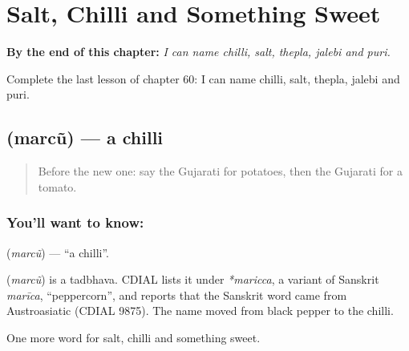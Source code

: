 
\chapter{Salt, Chilli and Something Sweet}
\label{ch:gu-salt-chilli-and-something-sweet}

\begin{chapteropening}
\textbf{By the end of this chapter:} \emph{I can name chilli, salt, thepla, jalebi and puri.}

Complete the last lesson of chapter 60: I can name chilli, salt, thepla, jalebi and puri.
\end{chapteropening}

\section[\texorpdfstring{\gu{મરચું} (marcũ)}{મરચું (marcũ)}]{ (marcũ) — a chilli}

\label{lesson:GU-C60-chilli}



\begin{quote}
Before the new one: say the Gujarati for potatoes, then the Gujarati for a tomato.
\end{quote}

\subsection*{You'll want to know: }
\textbf{} (\emph{marcũ}) — \textquotedblleft{}a chilli\textquotedblright{}.

\begin{cousinweb}
\textbf{} (\emph{marcũ}) is a tadbhava. CDIAL lists it under \emph{*maricca}, a variant of Sanskrit \emph{marīca}, \textquotedblleft{}peppercorn\textquotedblright{}, and reports that the Sanskrit word came from Austroasiatic (CDIAL 9875). The name moved from black pepper to the chilli.
\end{cousinweb}

\begin{grammarlens}[title={What you've built}]
One more word for salt, chilli and something sweet.
\end{grammarlens}

